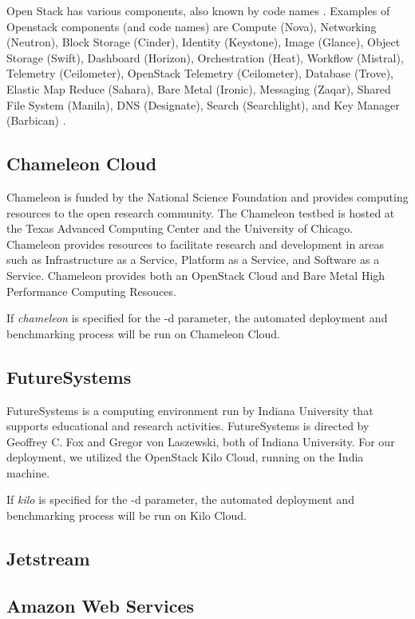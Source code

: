 \documentclass[9pt,twocolumn,twoside]{../../styles/osajnl}
\begin{document}
Open Stack has various components, also known by code names \cite{www-wikiOpenStack}.  Examples of Openstack components (and code names) are Compute (Nova), Networking (Neutron), Block Storage (Cinder), Identity (Keystone), Image (Glance), Object Storage (Swift), Dashboard (Horizon), Orchestration (Heat), Workflow (Mistral), Telemetry (Ceilometer), OpenStack Telemetry (Ceilometer), Database (Trove), Elastic Map Reduce (Sahara), Bare Metal (Ironic), Messaging (Zaqar), Shared File System (Manila), DNS (Designate), Search (Searchlight), and Key Manager (Barbican) \cite{www-wikiOpenStack}.

\subsection{Chameleon Cloud}

Chameleon is funded by the National Science Foundation and provides computing resources to the open research community.  The Chameleon testbed is hosted at the Texas Advanced Computing Center and the University of Chicago. Chameleon provides resources to facilitate research and development in areas such as Infrastructure as a Service, Platform as a Service, and Software as a Service.  Chameleon provides both an OpenStack Cloud and Bare Metal High Performance Computing Resouces. \cite{www-chamAbout}

If \emph{chameleon} is specified for the -d parameter, the automated deployment and benchmarking process will be run on Chameleon Cloud.

\subsection{FutureSystems}

FutureSystems is a computing environment run by Indiana University that supports educational and research activities. \cite{www-futureSystems} FutureSystems is directed by Geoffrey C. Fox and Gregor von Laszewski, both of Indiana University. \cite{www-fsAbout}  For our deployment, we utilized the OpenStack Kilo Cloud, running on the India machine.

If \emph{kilo} is specified for the -d parameter, the automated deployment and benchmarking process will be run on Kilo Cloud.

\subsection{Jetstream}

\subsection{Amazon Web Services}
\end{document}
